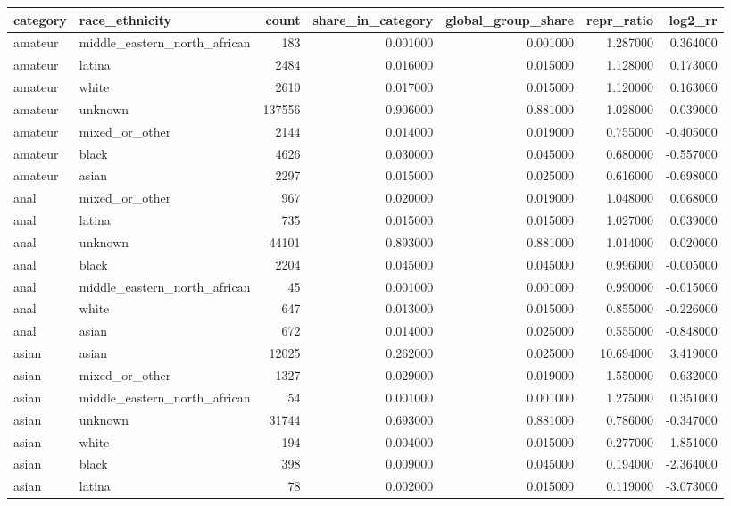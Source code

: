 \begin{tabular}{llrrrrr}
\toprule
category & race_ethnicity & count & share_in_category & global_group_share & repr_ratio & log2_rr \\
\midrule
amateur & middle_eastern_north_african & 183 & 0.001000 & 0.001000 & 1.287000 & 0.364000 \\
amateur & latina & 2484 & 0.016000 & 0.015000 & 1.128000 & 0.173000 \\
amateur & white & 2610 & 0.017000 & 0.015000 & 1.120000 & 0.163000 \\
amateur & unknown & 137556 & 0.906000 & 0.881000 & 1.028000 & 0.039000 \\
amateur & mixed_or_other & 2144 & 0.014000 & 0.019000 & 0.755000 & -0.405000 \\
amateur & black & 4626 & 0.030000 & 0.045000 & 0.680000 & -0.557000 \\
amateur & asian & 2297 & 0.015000 & 0.025000 & 0.616000 & -0.698000 \\
anal & mixed_or_other & 967 & 0.020000 & 0.019000 & 1.048000 & 0.068000 \\
anal & latina & 735 & 0.015000 & 0.015000 & 1.027000 & 0.039000 \\
anal & unknown & 44101 & 0.893000 & 0.881000 & 1.014000 & 0.020000 \\
anal & black & 2204 & 0.045000 & 0.045000 & 0.996000 & -0.005000 \\
anal & middle_eastern_north_african & 45 & 0.001000 & 0.001000 & 0.990000 & -0.015000 \\
anal & white & 647 & 0.013000 & 0.015000 & 0.855000 & -0.226000 \\
anal & asian & 672 & 0.014000 & 0.025000 & 0.555000 & -0.848000 \\
asian & asian & 12025 & 0.262000 & 0.025000 & 10.694000 & 3.419000 \\
asian & mixed_or_other & 1327 & 0.029000 & 0.019000 & 1.550000 & 0.632000 \\
asian & middle_eastern_north_african & 54 & 0.001000 & 0.001000 & 1.275000 & 0.351000 \\
asian & unknown & 31744 & 0.693000 & 0.881000 & 0.786000 & -0.347000 \\
asian & white & 194 & 0.004000 & 0.015000 & 0.277000 & -1.851000 \\
asian & black & 398 & 0.009000 & 0.045000 & 0.194000 & -2.364000 \\
asian & latina & 78 & 0.002000 & 0.015000 & 0.119000 & -3.073000 \\

\end{tabular}

